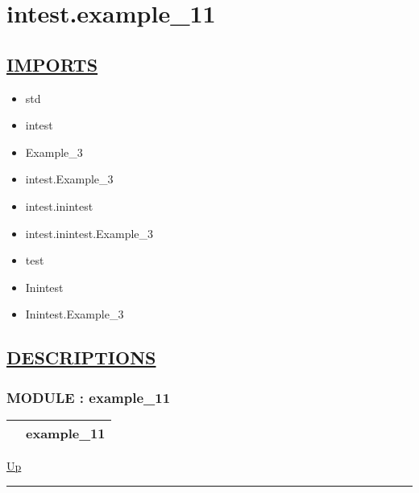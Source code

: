 \chapter*{intest.example\_11}
\hypertarget{ecldoc:toc:intest.example_11}{}

\section*{\underline{IMPORTS}}
\begin{itemize}
\item std
\item intest
\item Example\_3
\item intest.Example\_3
\item intest.inintest
\item intest.inintest.Example\_3
\item test
\item Inintest
\item Inintest.Example\_3
\end{itemize}

\section*{\underline{DESCRIPTIONS}}
\subsection*{MODULE : example\_11}
\hypertarget{ecldoc:intest.example_11}{}

{\renewcommand{\arraystretch}{1.5}
\begin{tabularx}{\textwidth}{|>{\raggedright\arraybackslash}l|X|}
\hline
\hspace{0pt} & example\_11 \\
\hline
\end{tabularx}
}

\hyperlink{ecldoc:toc:intest}{Up}

\par


\rule{\textwidth}{0.4pt}
